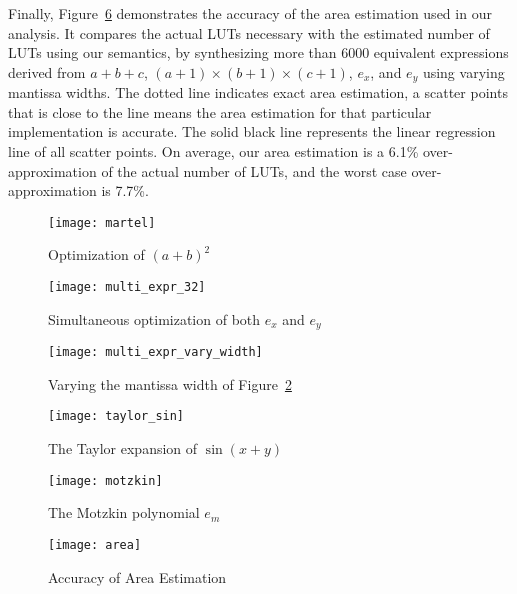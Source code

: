 Finally, Figure~\ref{so:fig:area} demonstrates the accuracy of the area estimation
used in our analysis. It compares the actual LUTs necessary with the estimated
number of LUTs using our semantics, by synthesizing more than 6000 equivalent
expressions derived from $a + b + c$, $(a + 1) \times (b + 1) \times (c + 1)$,
$e_x$, and $e_y$ using varying mantissa widths. The dotted line indicates exact
area estimation, a scatter points that is close to the line means the area
estimation for that particular implementation is accurate. The solid black line
represents the linear regression line of all scatter points. On average, our
area estimation is a 6.1\% over-approximation of the actual number of LUTs, and
the worst case over-approximation is 7.7\%.
\newcommand{\figsize}{0.6}
\begin{figure}[ht]
    \centering
    \texttt{[image: martel]}
    \caption{Optimization of ${(a + b)}^2$}\label{so:fig:martel}
\end{figure}
\begin{figure}[ht]
    \centering
    \texttt{[image: multi\_expr\_32]}
    \caption{Simultaneous optimization of both $e_x$ and $e_y$}
    {}\label{so:fig:multi_expr_32}
\end{figure}
\begin{figure}[ht]
    \centering
    \texttt{[image: multi\_expr\_vary\_width]}
    \caption{Varying the mantissa width of Figure~\ref{so:fig:multi_expr_32}}
    {}\label{so:fig:multi_expr_vary_width}
\end{figure}
\begin{figure}[ht]
    \centering
    \texttt{[image: taylor\_sin]}
    \caption{The Taylor expansion of $\sin(x + y)$}
    {}\label{so:fig:taylor_sin}
\end{figure}
\begin{figure}[ht]
    \centering
    \texttt{[image: motzkin]}
    \caption{The Motzkin polynomial $e_m$}\label{so:fig:motzkin}
\end{figure}
\begin{figure}[ht]
    \centering
    \texttt{[image: area]}
    \caption{Accuracy of Area Estimation}\label{so:fig:area}
\end{figure}
